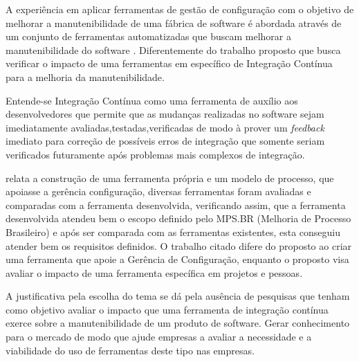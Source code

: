 A experiência em aplicar ferramentas  de gestão de configuração com o objetivo de melhorar a manutenibilidade de uma fábrica de software é abordada através de um conjunto de ferramentas automatizadas que buscam melhorar a manutenibilidade do software \cite{poliana2005}. Diferentemente do trabalho proposto que busca verificar o impacto de uma ferramentas em específico de Integração Contínua  para a melhoria da manutenibilidade.

Entende-se Integração Contínua como uma ferramenta de auxílio aos desenvolvedores que permite que as mudanças realizadas no software sejam imediatamente avaliadas,testadas,verificadas de modo à prover um  \textit{feedback} imediato para correção de possíveis erros de integração que somente seriam verificados futuramente após problemas mais complexos de integração\cite{paul2007}.

 relata a construção de uma ferramenta própria e um modelo de processo, que apoiasse a gerência configuração, diversas ferramentas foram avaliadas e comparadas com a ferramenta desenvolvida, verificando assim, que a ferramenta desenvolvida atendeu bem o escopo definido pelo MPS.BR (Melhoria de Processo Brasileiro)  e após ser comparada com as ferramentas existentes, esta conseguiu atender bem os requisitos definidos. O trabalho citado difere do proposto ao criar uma ferramenta que apoie a Gerência de Configuração, enquanto o proposto visa avaliar o impacto de uma ferramenta específica em projetos e pessoas.

A justificativa pela escolha do tema se dá pela ausência de pesquisas que tenham como objetivo avaliar o impacto que uma ferramenta de integração contínua exerce sobre a manutenibilidade de um produto de software. Gerar conhecimento para o mercado de modo que ajude empresas a avaliar a necessidade e a viabilidade do uso de ferramentas deste tipo nas empresas.